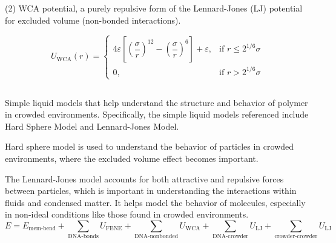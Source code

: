 \documentclass[12pt]{article}
\begin{document}
\begin{flushleft}
          \indent\indent   (2) WCA potential, a purely repulsive form of the Lennard-Jones (LJ) potential 
          \indent \indent for excluded volume (non-bonded interactions).
          
\begin{equation}
U_{\text{WCA}}(r) = 
\begin{cases}
4\varepsilon \left[ \left( \dfrac{\sigma}{r} \right)^{12} - \left( \dfrac{\sigma}{r} \right)^6 \right] + \varepsilon, & \text{if } r \leq 2^{1/6} \sigma \\
0, & \text{if } r > 2^{1/6} \sigma
\end{cases}
\end{equation}

    


\subsection*{}

       
Simple liquid models that help understand the structure and behavior of polymer in crowded environments. Specifically, the simple liquid models referenced include Hard Sphere Model and Lennard-Jones Model. 

Hard sphere model is used to understand the behavior of particles in crowded environments, where the excluded volume effect becomes important. 

The Lennard-Jones model accounts for both attractive and repulsive forces between particles, which is important in understanding the interactions within fluids and condensed matter. It helps model the behavior of molecules, especially in non-ideal conditions like those found in crowded environments.
\begin{equation}
E = E_{\text{mem-bend}}+\sum_{\text{DNA-bonds}} U_{\mathrm{FENE}} + \sum_{\text{DNA-nonbonded}} U_{\mathrm{WCA}} 
+ \sum_{\text{DNA-crowder}} U_{\mathrm{LJ}} 
+ \sum_{\text{crowder-crowder}} U_{\mathrm{LJ}}
\end{equation} 


\end{flushleft}
\end{document}
